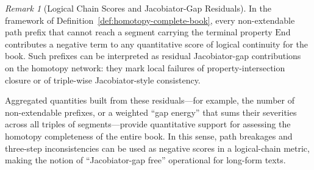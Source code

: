 \documentclass[11pt]{book}
\theoremstyle{plain}
\theoremstyle{definition}
\theoremstyle{remark}
\newtheorem{remark}[theorem]{Remark}
\begin{document}
\begin{remark}[Logical Chain Scores and Jacobiator-Gap Residuals]
\label{rem:logical-chain-scores}
In the framework of Definition~\ref{def:homotopy-complete-book}, every
non-extendable path prefix that cannot reach a segment carrying the terminal
property $\mathrm{End}$ contributes a negative term to any quantitative
score of logical continuity for the book. Such prefixes can be interpreted
as residual Jacobiator-gap contributions on the homotopy network: they mark
local failures of property-intersection closure or of triple-wise
Jacobiator-style consistency.

Aggregated quantities built from these residuals---for example, the number
of non-extendable prefixes, or a weighted ``gap energy'' that sums their
severities across all triples of segments---provide quantitative support
for assessing the homotopy completeness of the entire book. In this sense,
path breakages and three-step inconsistencies can be used as negative scores
in a logical-chain metric, making the notion of ``Jacobiator-gap free''
operational for long-form texts.
\end{remark}
\end{document}
